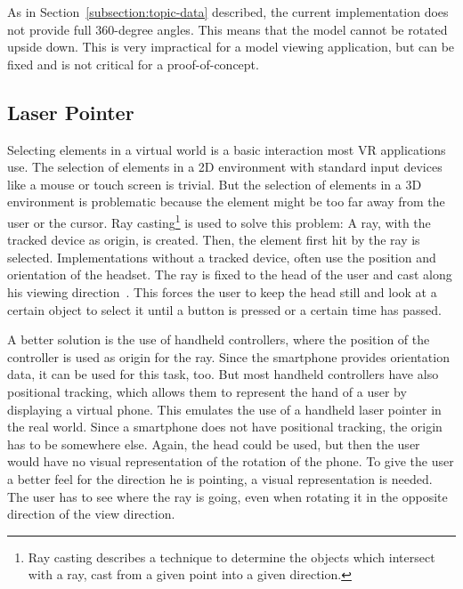 As in Section~\ref{subsection:topic-data} described, the current implementation does not provide full 360-degree angles. This means that the model cannot be rotated upside down. This is very impractical for a model viewing application, but can be fixed and is not critical for a proof-of-concept.


\subsection{Laser Pointer}\label{subsection:laser-pointer}

Selecting elements in a virtual world is a basic interaction most \ac{VR} applications use. The selection of elements in a \ac{2D} environment with standard input devices like a mouse or touch screen is trivial. But the selection of elements in a \ac{3D} environment is problematic because the element might be too far away from the user or the cursor. Ray casting\footnote{Ray casting describes a technique to determine the objects which intersect with a ray, cast from a given point into a given direction.} is used to solve this problem: A ray, with the tracked device as origin, is created. Then, the element first hit by the ray is selected. Implementations without a tracked device, often use the position and orientation of the headset. The ray is fixed to the head of the user and cast along his viewing direction~\cite[23]{Kamm.2018}. This forces the user to keep the head still and look at a certain object to select it until a button is pressed or a certain time has passed.


A better solution is the use of handheld controllers, where the position of the controller is used as origin for the ray. Since the smartphone provides orientation data, it can be used for this task, too. But most handheld controllers have also positional tracking, which allows them to represent the hand of a user by displaying a virtual phone. This emulates the use of a handheld laser pointer in the real world. Since a smartphone does not have positional tracking, the origin has to be somewhere else. Again, the head could be used, but then the user would have no visual representation of the rotation of the phone. To give the user a better feel for the direction he is pointing, a visual representation is needed. The user has to see where the ray is going, even when rotating it in the opposite direction of the view direction.

